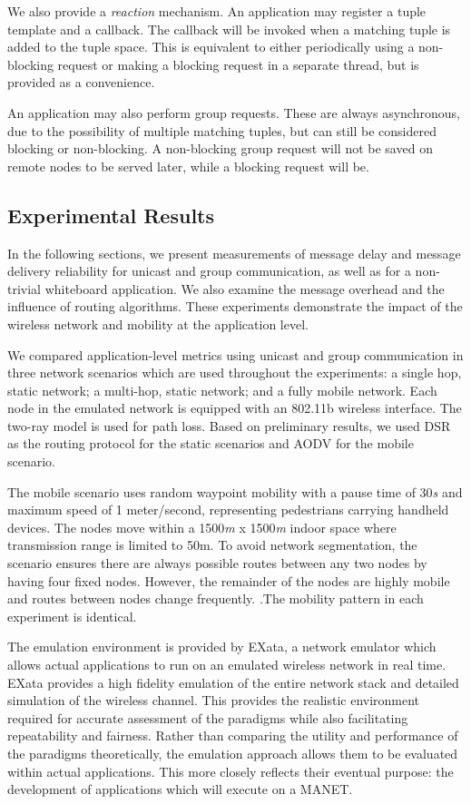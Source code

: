 We also provide a \textit{reaction} mechanism\cite{lime}. An application may register a tuple template and a callback. The callback will be invoked when a matching tuple is added to the tuple space. This is equivalent to either periodically using a non-blocking request or making a blocking request in a separate thread, but is provided as a convenience.

An application may also perform group requests. These are always asynchronous, due to the possibility of multiple matching tuples, but can still be considered blocking or non-blocking. A non-blocking group request will not be saved on remote nodes to be served later, while a blocking request will be.

\subsection{Experimental Results}

In the following sections, we present measurements of message delay and message delivery reliability for unicast and group communication, as well as for a non-trivial whiteboard application. We also examine the message overhead and the influence of routing algorithms. These experiments demonstrate the impact of the wireless network and mobility at the application level.

We compared application-level metrics using unicast and group communication in three network scenarios which are used throughout the experiments: a single hop, static network; a multi-hop, static network; and a fully mobile network. Each node in the emulated network is equipped with an 802.11b wireless interface. The two-ray model is used for path loss. Based on preliminary results, we used DSR\cite{dsr} as the routing protocol for the static scenarios and AODV\cite{aodv} for the mobile scenario.

The mobile scenario uses random waypoint mobility with a pause time of 30\textit{s} and maximum speed of 1 meter/second, representing pedestrians carrying handheld devices. The nodes move within a 1500\textit{m} x 1500\textit{m} indoor space where transmission range is limited to 50m. To avoid network segmentation, the scenario ensures there are always possible routes between any two nodes by having four fixed nodes. However, the remainder of the nodes are highly mobile and routes between nodes change frequently. .The mobility pattern in each experiment is identical.
 
The emulation environment is provided by EXata\cite{exata}, a network emulator which allows actual applications to run on an emulated wireless network in real time. EXata provides a high fidelity emulation of the entire network stack and detailed simulation of the wireless channel. This provides the realistic environment required for accurate assessment of the paradigms while also facilitating repeatability and fairness\cite{fidelity1,fidelity2}. Rather than comparing the utility and performance of the paradigms theoretically, the emulation approach allows them to be evaluated within actual applications. This more closely reflects their eventual purpose: the development of applications which will execute on a MANET.


